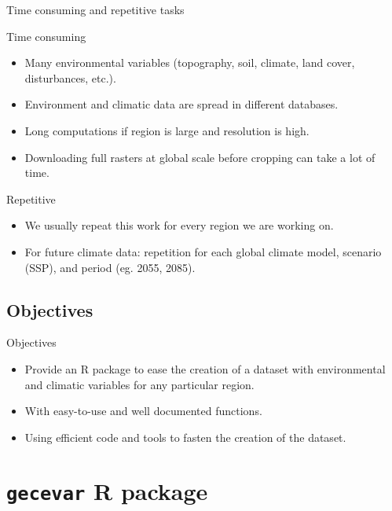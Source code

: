 \documentclass[10pt,table,dvipsnames,compress]{beamer}
\begin{document}
\begin{frame}[label={sec:org3c98f51}]{Time consuming and repetitive tasks}
\begin{block}{Time consuming}
\begin{itemize}
\item Many environmental variables (topography, soil, climate, land cover, disturbances, etc.).
\item Environment and climatic data are spread in different databases.
\item Long computations if region is large and resolution is high.
\item Downloading full rasters at global scale before cropping can take a lot of time.
\end{itemize}
\end{block}

\begin{block}{Repetitive}
\begin{itemize}
\item We usually repeat this work for every region we are working on.
\item For future climate data: repetition for each global climate model, scenario (SSP), and period (eg. 2055, 2085).
\end{itemize}
\end{block}
\end{frame}

\subsection{Objectives}
\label{sec:org21f5792}

\begin{frame}[label={sec:org955860c}]{Objectives}
\begin{itemize}
\item Provide an R package to ease the creation of a dataset with environmental and climatic variables for any particular region.
\item With easy-to-use and well documented functions.
\item Using efficient code and tools to fasten the creation of the dataset.
\end{itemize}
\end{frame}

\section{\texttt{gecevar} R package}
\label{sec:org12cea20}
\end{document}
